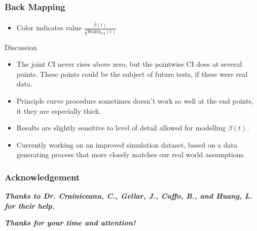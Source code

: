 \documentclass[9 pt]{beamer}
\newcommand{\bi}{\begin{itemize}}
\newcommand{\ei}{\end{itemize}}
\begin{document}
\begin{frame}
\frametitle{Back Mapping}
\begin{figure}[ht]
\centering
{}
\end{figure}
\begin{itemize}
\item<2-| alert@2> Color indicates value $\frac{\hat{\beta}(t)}{\frac{1}{2}\text{Width}_{CI}(t)}$
\end{itemize}
\end{frame}
\begin{frame}{Discussion}
\bi
\item<1-| alert@1> The joint CI never rises above zero, but the pointwise CI does at several points. These points could be the subject of future tests, if these were real data. 
\item<2-| alert@2> Principle curve procedure sometimes doesn't work so well at the end points, it they are especially thick.
\item<2-| alert@2> Results are slightly sensitive to level of detail allowed for modelling $\beta(t)$.
\item<3-| alert@3> Currently working on an improved simulation dataset, based on a data generating process that more closely matches our real world assumptions.
\ei
\end{frame}

\begin{frame}
\frametitle{Acknowledgement}
{\bf\it Thanks to Dr. Crainiceanu, C., Gellar, J., Caffo, B., and Huang, L. for their help.}\\
\smallskip

{\bf\it Thanks for your time and attention!}
\end{frame}
\end{document}
